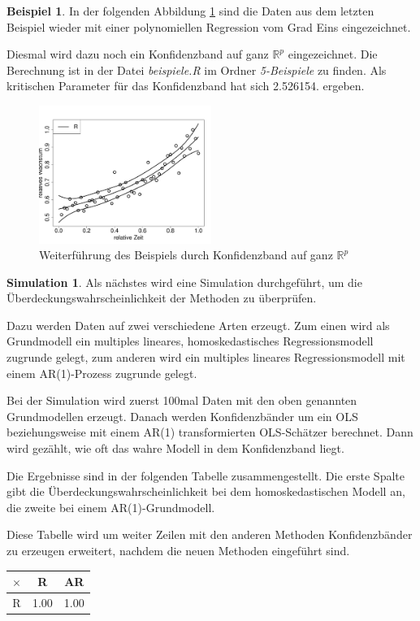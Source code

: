 \documentclass[12pt,a4paper]{article}
\theoremstyle{definition}
\newtheorem{Beispiel}[Definition]{Beispiel}
\theoremstyle{definition}
\theoremstyle{definition}
\newtheorem{Simulation}[Definition]{Simulation}
\theoremstyle{definition}
\newcommand{\cR}{2.526154}
\newcommand{\ntest}{100}
\newcommand{\UeberRR}{1.00}
\newcommand{\UeberARR}{1.00}
\begin{document}
\begin{Beispiel}
In der folgenden Abbildung \ref{KB-ganz-R-BSP} sind die Daten aus dem letzten Beispiel wieder mit einer polynomiellen Regression vom Grad Eins eingezeichnet.

Diesmal wird dazu noch ein Konfidenzband auf ganz $\mathbb{R}^{p}$ eingezeichnet. Die Berechnung ist in der Datei \textit{beispiele.R} im Ordner \textit{5-Beispiele} zu finden. Als kritischen Parameter für das Konfidenzband hat sich \cR . ergeben.

\begin{figure}[H] 
  \centering
     \includegraphics[width=0.5\textwidth]{Bsp-KB-R}
  \caption{Weiterführung des Beispiels durch Konfidenzband auf ganz $\mathbb{R}^{p}$}
  \label{KB-ganz-R-BSP}
\end{figure}

\end{Beispiel}

\begin{Simulation}
Als nächstes wird eine Simulation durchgeführt, um die Überdeckungswahrscheinlichkeit der Methoden zu überprüfen.

Dazu werden Daten auf zwei verschiedene Arten erzeugt. Zum einen wird als Grundmodell ein multiples lineares, homoskedastisches Regressionsmodell zugrunde gelegt, zum anderen wird ein multiples lineares Regressionsmodell mit einem AR(1)-Prozess zugrunde gelegt. 

Bei der Simulation wird zuerst \ntest mal Daten mit den oben genannten Grundmodellen erzeugt. Danach werden Konfidenzbänder um ein OLS beziehungsweise mit einem AR(1) transformierten OLS-Schätzer berechnet. Dann wird gezählt, wie oft das wahre Modell in dem Konfidenzband liegt. 

Die Ergebnisse sind in der folgenden Tabelle zusammengestellt. Die erste Spalte gibt die Überdeckungswahrscheinlichkeit bei dem homoskedastischen Modell an, die zweite bei einem AR(1)-Grundmodell. 

Diese Tabelle wird um weiter Zeilen mit den anderen Methoden Konfidenzbänder zu erzeugen erweitert, nachdem die neuen Methoden eingeführt sind.

\begin{center}
\begin{tabular}{|c|c|c|}
\hline 
$\times$ & R & AR \\ 
\hline 
R & \UeberRR & \UeberARR \\ 
\hline 
\end{tabular}
\end{center}

\end{Simulation}
\end{document}

